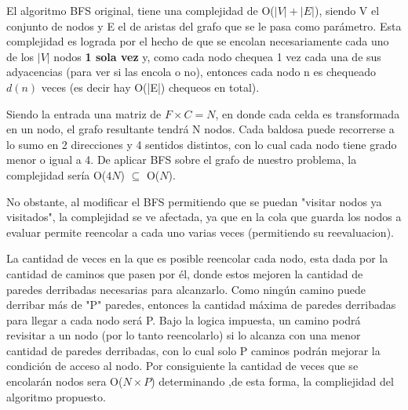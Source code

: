  El algoritmo BFS original, tiene una complejidad de O($|V|+|E|$), siendo V el conjunto de nodos y E el de aristas del grafo que se le pasa como parámetro. Esta complejidad es lograda por el hecho de que se encolan necesariamente cada uno de los $|V|$ nodos {\bf 1 sola vez} y, como cada nodo chequea 1 vez cada una de sus adyacencias (para ver si las encola o no), entonces cada nodo n es chequeado $d(n)$ veces (es decir hay O(|E|) chequeos en total). 

Siendo la entrada una matriz de $F \times C = N$, en donde cada celda es transformada en un nodo, el grafo resultante tendrá N nodos. Cada baldosa puede recorrerse a lo sumo en 2 direcciones y 4 sentidos distintos, con lo cual cada nodo tiene grado menor o igual a 4. De aplicar BFS sobre el grafo de nuestro problema, la complejidad sería O($4N$) $\subseteq$ O($N$).

No obstante, al modificar el BFS permitiendo que se puedan "visitar nodos ya visitados", la complejidad se ve afectada, ya que en la cola que guarda los nodos a evaluar permite reencolar a cada uno varias veces (permitiendo su reevaluacion).

La cantidad de veces en la que es posible reencolar cada nodo, esta dada por la cantidad de caminos que pasen por él, donde estos mejoren la cantidad de paredes derribadas necesarias para alcanzarlo. Como ningún camino puede derribar más de "P" paredes, entonces la cantidad máxima de paredes derribadas para llegar a cada nodo será P. Bajo la logica impuesta, un camino podrá revisitar a un nodo (por lo tanto reencolarlo) si lo alcanza con una menor cantidad de paredes derribadas, con lo cual solo P caminos podrán mejorar la condición de acceso al nodo. Por consiguiente la cantidad de veces que se encolarán nodos sera O($N \times P$) determinando ,de esta forma, la compliejidad del algoritmo propuesto.






